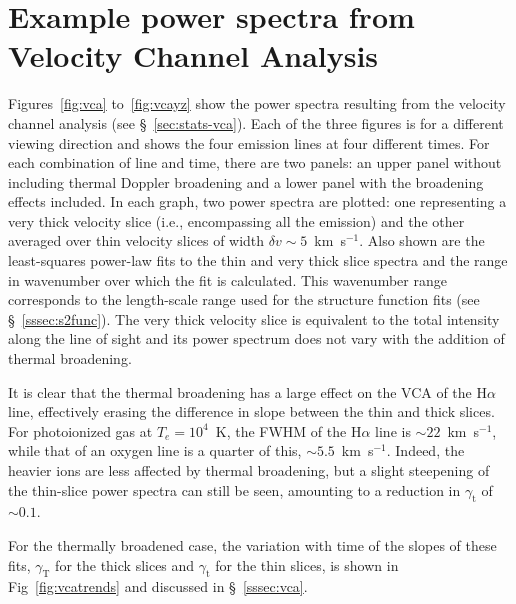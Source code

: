 \documentclass[useAMS,usenatbib]{mn2e}
\newcommand\gammaVCAthin{\ensuremath{\gamma_{\mathrm{t}}}}
\newcommand\gammaVCAvthick{\ensuremath{\gamma_{\mathrm{T}}}}
\begin{document}
\section[]{Example power spectra from Velocity Channel Analysis}
\label{app:vca}
Figures~\ref{fig:vca} to~\ref{fig:vcayz} show the power spectra
resulting from the velocity channel analysis (see
\S~\ref{sec:stats-vca}). Each of the three figures is for a different
viewing direction and shows the four emission lines at four different
times. For each combination of line and time, there are two panels: an
upper panel without including thermal Doppler broadening and a lower
panel with the broadening effects included.  In each graph, two power
spectra are plotted: one representing a very thick velocity slice
(i.e., encompassing all the emission) and the other averaged over thin
velocity slices of width $\delta v \sim 5$~km~s$^{-1}$.  Also shown
are the least-squares power-law fits to the thin and very thick slice
spectra and the range in wavenumber over which the fit is
calculated. This wavenumber range corresponds to the length-scale
range used for the structure function fits (see
\S~\ref{sssec:s2func}).  The very thick velocity slice is equivalent
to the total intensity along the line of sight and its power spectrum
does not vary with the addition of thermal broadening.

It is clear that the thermal broadening has a large effect on the VCA
of the H$\alpha$ line, effectively erasing the difference in slope
between the thin and thick slices.  For photoionized gas at $T_e=
10^4$~K, the FWHM of the H$\alpha$ line is $\sim 22$~km~s$^{-1}$,
while that of an oxygen line is a quarter of this, $\sim
5.5$~km~s$^{-1}$.  Indeed, the heavier ions are less affected by
thermal broadening, but a slight steepening of the thin-slice power
spectra can still be seen, amounting to a reduction in \gammaVCAthin{}
of \(\sim 0.1\).

For the thermally broadened case, the variation with time of the
slopes of these fits, \gammaVCAvthick{} for the thick slices and
\gammaVCAthin{} for the thin slices, is shown in
Fig~\ref{fig:vcatrends} and discussed in \S~\ref{sssec:vca}.
\end{document}
